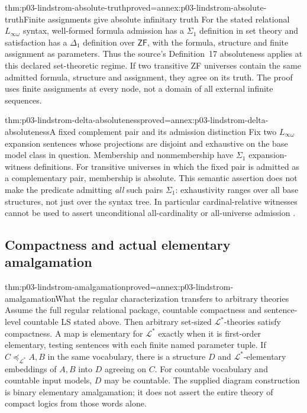 \begin{hbtheorem}{thm:p03-lindstrom-absolute-truth}{proved=annex:p03-lindstrom-absolute-truth}{Finite assignments give absolute infinitary truth}
For the stated relational \(L_{\infty\omega}\) syntax, well-formed
formula admission has a \(\Sigma_1\) definition in set theory and
satisfaction has a \(\Delta_1\) definition over \(\mathsf{ZF}\),
with the formula, structure and finite assignment as parameters.
Thus the source's Definition~17 absoluteness applies at this declared
set-theoretic regime. If two transitive ZF universes contain the same
admitted formula, structure and assignment, they agree on its truth.
The proof uses finite assignments at every node, not a domain of all
external infinite sequences.
\end{hbtheorem}

\begin{hbtheorem}{thm:p03-lindstrom-delta-absoluteness}{proved=annex:p03-lindstrom-delta-absoluteness}{A fixed complement pair and its admission distinction}
Fix two \(L_{\infty\omega}\) expansion sentences whose projections
are disjoint and exhaustive on the base model class in question.
Membership and nonmembership have \(\Sigma_1\) expansion-witness
definitions. For transitive universes in which the fixed pair is admitted
as a complementary pair, membership is absolute. This semantic assertion
does not make the predicate admitting \emph{all} such pairs
\(\Sigma_1\): exhaustivity ranges over all base structures, not just
over the syntax tree. In particular cardinal-relative witnesses cannot
be used to assert unconditional all-cardinality or all-universe admission
\cite[Definition~17 and the discussion preceding Theorem~18, pp.~26--27]
{KennedyVaananen2021LogicalityV1}.
\end{hbtheorem}

\subsection{Compactness and actual elementary amalgamation}

\begin{hbtheorem}{thm:p03-lindstrom-amalgamation}{proved=annex:p03-lindstrom-amalgamation}{What the regular characterization transfers to arbitrary theories}
Assume the full regular relational package, countable compactness and
sentence-level countable LS stated above. Then arbitrary set-sized
\(\mathcal L^*\)-theories satisfy compactness. A map is elementary
for \(\mathcal L^*\) exactly when it is first-order elementary, testing
sentences with each finite named parameter tuple. If
\(C\preccurlyeq_{\mathcal L^*}A,B\) in the same vocabulary, there is
a structure \(D\) and \(\mathcal L^*\)-elementary embeddings of
\(A,B\) into \(D\) agreeing on \(C\). For countable vocabulary and
countable input models, \(D\) may be countable.
The supplied diagram construction is binary elementary amalgamation;
it does not assert the entire theory of compact logics from those words alone.
\end{hbtheorem}

